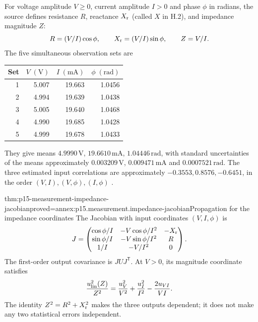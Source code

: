 For voltage amplitude \(V\geq0\), current amplitude \(I>0\) and phase
\(\phi\) in radians, the source defines resistance \(R\), reactance
\(X_{\rm r}\) (called \(X\) in H.2), and impedance magnitude \(Z\):
\[
 R=(V/I)\cos\phi,\qquad X_{\rm r}=(V/I)\sin\phi,\qquad Z=V/I.
\]
The five simultaneous observation sets are
\begin{center}
\begin{tabular}{rrrr}
\toprule
Set & \(V\;(\mathrm V)\) & \(I\;(\mathrm{mA})\) & \(\phi\;(\mathrm{rad})\)\\
\midrule
1&5.007&19.663&1.0456\\
2&4.994&19.639&1.0438\\
3&5.005&19.640&1.0468\\
4&4.990&19.685&1.0428\\
5&4.999&19.678&1.0433\\
\bottomrule
\end{tabular}
\end{center}
They give means \(4.9990\,\mathrm V\), \(19.6610\,\mathrm{mA}\),
\(1.04446\,\mathrm{rad}\), with standard uncertainties of the means
approximately \(0.003209\,\mathrm V\), \(0.009471\,\mathrm{mA}\) and
\(0.0007521\,\mathrm{rad}\). The three estimated input correlations are
approximately \(-0.3553,0.8576,-0.6451\), in the order
\((V,I),(V,\phi),(I,\phi)\)
\cite[H.2.1--H.2.2, Table~H.2]{JCGM1002008EMeasurement}.

\begin{hbtheorem}{thm:p15-measurement-impedance-jacobian}{proved=annex:p15.measurement.impedance-jacobian}{Propagation for the impedance coordinates}
The Jacobian with input coordinates \((V,I,\phi)\) is
\[
 J=\begin{pmatrix}
 \cos\phi/I&-V\cos\phi/I^2&-X_{\rm r}\\
 \sin\phi/I&-V\sin\phi/I^2&R\\
 1/I&-V/I^2&0
 \end{pmatrix}.
\]
The first-order output covariance is \(JUJ^{\mathsf T}\).
At \(V>0\), its magnitude coordinate satisfies
\[
 \frac{u_{\rm lin}^2(Z)}{Z^2}
 =\frac{u_V^2}{V^2}+\frac{u_I^2}{I^2}
       -\frac{2u_{VI}}{VI}.
\]
The identity \(Z^2=R^2+X_{\rm r}^2\) makes the three outputs dependent;
it does not make any two statistical errors independent.
\end{hbtheorem}


